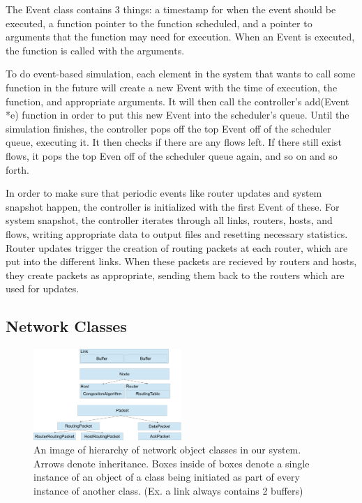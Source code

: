 The Event class contains 3 things: a timestamp for when the event should be executed, a function pointer to the function scheduled, and a pointer to arguments that the function may need for execution. When an Event is executed, the function is called with the arguments.

    To do event-based simulation, each element in the system that wants to call some function in the future will create a new Event with the time of execution, the function, and appropriate arguments. It will then call the controller's add(Event *e) function in order to put this new Event into the scheduler's queue. Until the simulation finishes, the controller pops off the top Event off of the scheduler queue, executing it. It then checks if there are any flows left. If there still exist flows, it pops the top Even off of the scheduler queue again, and so on and so forth. 

    In order to make sure that periodic events like router updates and system snapshot happen, the controller is initialized with the first Event of these. For system snapshot, the controller iterates through all links, routers, hosts, and flows, writing appropriate data to output files and resetting necessary statistics. Router updates trigger the creation of routing packets at each router, which are put into the different links. When these packets are recieved by routers and hosts, they create packets as appropriate, sending them back to the routers which are used for updates.  



\subsection{Network Classes}

\begin{figure}[htbp]
    \centering
    \includegraphics[width=0.5\textwidth]{hierarchy.png}
    \caption{An image of hierarchy of network object classes in our system. Arrows denote inheritance. Boxes inside of boxes denote a single instance of an object of a class being initiated as part of every instance of another class. (Ex. a link always contains 2 buffers)}
\end{figure}

